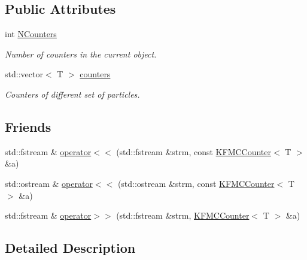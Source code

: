 \subsection*{Public Attributes}
\begin{DoxyCompactItemize}
\item 
int \hyperlink{structKFMCCounter_a5d2edf4a48889d68f9aa500ec6df4f18}{N\+Counters}\hypertarget{structKFMCCounter_a5d2edf4a48889d68f9aa500ec6df4f18}{}\label{structKFMCCounter_a5d2edf4a48889d68f9aa500ec6df4f18}

\begin{DoxyCompactList}\small\item\em Number of counters in the current object. \end{DoxyCompactList}\item 
std\+::vector$<$ T $>$ \hyperlink{structKFMCCounter_abbaf119d4b54cec95102245490f065ab}{counters}\hypertarget{structKFMCCounter_abbaf119d4b54cec95102245490f065ab}{}\label{structKFMCCounter_abbaf119d4b54cec95102245490f065ab}

\begin{DoxyCompactList}\small\item\em Counters of different set of particles. \end{DoxyCompactList}\end{DoxyCompactItemize}
\subsection*{Friends}
\begin{DoxyCompactItemize}
\item 
std\+::fstream \& \hyperlink{structKFMCCounter_a5c122439188dbe1105d9f394d4b0e259}{operator$<$$<$} (std\+::fstream \&strm, const \hyperlink{structKFMCCounter}{K\+F\+M\+C\+Counter}$<$ T $>$ \&a)
\item 
std\+::ostream \& \hyperlink{structKFMCCounter_a5346708c028a5cf1102259c5544c14f5}{operator$<$$<$} (std\+::ostream \&strm, const \hyperlink{structKFMCCounter}{K\+F\+M\+C\+Counter}$<$ T $>$ \&a)
\item 
std\+::fstream \& \hyperlink{structKFMCCounter_a8a4d328504a9f4340b557a8c15de4ef3}{operator$>$$>$} (std\+::fstream \&strm, \hyperlink{structKFMCCounter}{K\+F\+M\+C\+Counter}$<$ T $>$ \&a)
\end{DoxyCompactItemize}


\subsection{Detailed Description}
